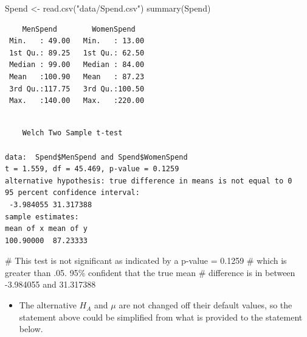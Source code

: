 \documentclass[
  letterpaper,
  DIV=11,
  numbers=noendperiod]{scrreprt}
\newenvironment{Shaded}{\begin{snugshade}}{\end{snugshade}}
\newcommand{\AttributeTok}[1]{\textcolor[rgb]{0.40,0.45,0.13}{#1}}
\newcommand{\CommentTok}[1]{\textcolor[rgb]{0.37,0.37,0.37}{#1}}
\newcommand{\DecValTok}[1]{\textcolor[rgb]{0.68,0.00,0.00}{#1}}
\newcommand{\FunctionTok}[1]{\textcolor[rgb]{0.28,0.35,0.67}{#1}}
\newcommand{\NormalTok}[1]{\textcolor[rgb]{0.00,0.23,0.31}{#1}}
\newcommand{\OtherTok}[1]{\textcolor[rgb]{0.00,0.23,0.31}{#1}}
\newcommand{\SpecialCharTok}[1]{\textcolor[rgb]{0.37,0.37,0.37}{#1}}
\newcommand{\StringTok}[1]{\textcolor[rgb]{0.13,0.47,0.30}{#1}}
\providecommand{\tightlist}{%
  \setlength{\itemsep}{0pt}\setlength{\parskip}{0pt}}\usepackage{longtable,booktabs,array}
\begin{document}
\begin{Shaded}
\begin{Highlighting}[]
\NormalTok{Spend }\OtherTok{\textless{}{-}} \FunctionTok{read.csv}\NormalTok{(}\StringTok{"data/Spend.csv"}\NormalTok{)}
\FunctionTok{summary}\NormalTok{(Spend)}
\end{Highlighting}
\end{Shaded}

\begin{verbatim}
    MenSpend        WomenSpend    
 Min.   : 49.00   Min.   : 13.00  
 1st Qu.: 89.25   1st Qu.: 62.50  
 Median : 99.00   Median : 84.00  
 Mean   :100.90   Mean   : 87.23  
 3rd Qu.:117.75   3rd Qu.:100.50  
 Max.   :140.00   Max.   :220.00  
\end{verbatim}

\begin{Shaded}
\end{Shaded}

\begin{verbatim}

    Welch Two Sample t-test

data:  Spend$MenSpend and Spend$WomenSpend
t = 1.559, df = 45.469, p-value = 0.1259
alternative hypothesis: true difference in means is not equal to 0
95 percent confidence interval:
 -3.984055 31.317388
sample estimates:
mean of x mean of y 
100.90000  87.23333 
\end{verbatim}

\begin{Shaded}
\begin{Highlighting}[]
\CommentTok{\# This test is not significant as indicated by a p{-}value = 0.1259}
\CommentTok{\# which is greater than .05.  95\% confident that the true mean}
\CommentTok{\# difference is in between {-}3.984055 and 31.317388}
\end{Highlighting}
\end{Shaded}

\begin{itemize}
\tightlist
\item
  The alternative \(H_A\) and \(\mu\) are not changed off their default
  values, so the statement above could be simplified from what is
  provided to the statement below.
\end{itemize}
\end{document}
